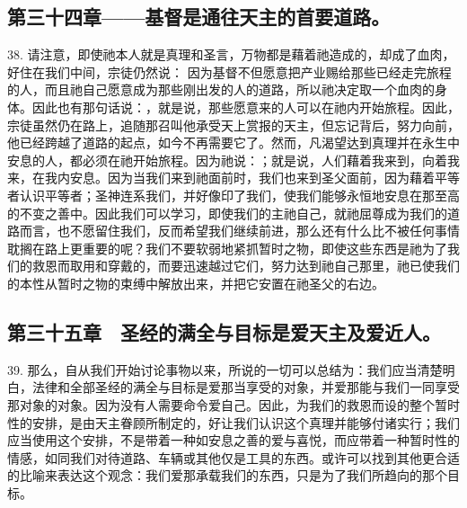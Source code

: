 
\subsection{第三十四章——基督是通往天主的首要道路。}

38. 请注意，即使祂本人就是真理和圣言，万物都是藉着祂造成的，却成了血肉，好住在我们中间，宗徒仍然说： 因为基督不但愿意把产业赐给那些已经走完旅程的人，而且祂自己愿意成为那些刚出发的人的道路，所以祂决定取一个血肉的身体。因此也有那句话说：，就是说，那些愿意来的人可以在祂内开始旅程。因此，宗徒虽然仍在路上，追随那召叫他承受天上赏报的天主，但忘记背后，努力向前，他已经跨越了道路的起点，如今不再需要它了。然而，凡渴望达到真理并在永生中安息的人，都必须在祂开始旅程。因为祂说：；就是说，人们藉着我来到，向着我来，在我内安息。因为当我们来到祂面前时，我们也来到圣父面前，因为藉着平等者认识平等者；圣神连系我们，并好像印了我们，使我们能够永恒地安息在那至高的不变之善中。因此我们可以学习，即使我们的主祂自己，就祂屈尊成为我们的道路而言，也不愿留住我们，反而希望我们继续前进，那么还有什么比不被任何事情耽搁在路上更重要的呢？我们不要软弱地紧抓暂时之物，即使这些东西是祂为了我们的救恩而取用和穿戴的，而要迅速越过它们，努力达到祂自己那里，祂已使我们的本性从暂时之物的束缚中解放出来，并把它安置在祂圣父的右边。\par


\subsection{第三十五章　圣经的满全与目标是爱天主及爱近人。}

39. 那么，自从我们开始讨论事物以来，所说的一切可以总结为：我们应当清楚明白，法律和全部圣经的满全与目标是爱那当享受的对象，并爱那能与我们一同享受那对象的对象。因为没有人需要命令爱自己。因此，为我们的救恩而设的整个暂时性的安排，是由天主眷顾所制定的，好让我们认识这个真理并能够付诸实行；我们应当使用这个安排，不是带着一种如安息之善的爱与喜悦，而应带着一种暂时性的情感，如同我们对待道路、车辆或其他仅是工具的东西。或许可以找到其他更合适的比喻来表达这个观念：我们爱那承载我们的东西，只是为了我们所趋向的那个目标。\par

